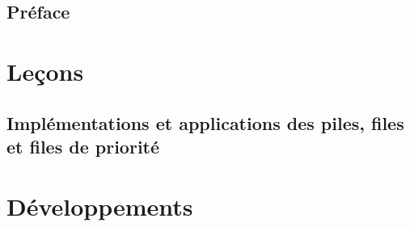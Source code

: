 






\tableofcontents

\chapter*{Préface}
%

\part{Leçons}

%
%
%
%
%
%
%

\chapter{Implémentations et applications des piles, files et files de priorité}
\label{L5}


\makeatletter
\renewcommand{\@chapapp}{Développement}
\setcounter{chapter}{0}
\makeatother
\renewcommand\theHchapter{sec.\thechapter} %

\part{Développements}
 


